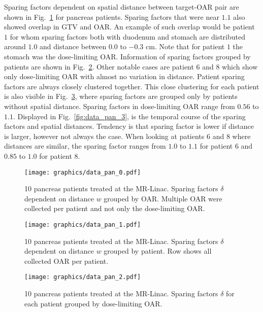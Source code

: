 \documentclass[\relativeRoot/ada.tex]{subfiles}
\begin{document}
Sparing factors dependent on spatial distance between target-OAR pair are shown in Fig.~\ref{fig:data_pan_0} for pancreas patients. Sparing factors that were near $1.1$ also showed overlap in GTV and OAR. An example of such overlap would be patient $1$ for whom sparing factors both with duodenum and stomach are distributed around $1.0$ and distance between $0.0$ to $-0.3$ cm. Note that for patient $1$ the stomach was the dose-limiting OAR. Information of sparing factors grouped by patients are shown in Fig.~\ref{fig:data_pan_1}. Other notable cases are patient $6$ and $8$ which show only dose-limiting OAR with almost no variation in distance. Patient sparing factors are always closely clustered together. This close clustering for each patient is also visible in Fig.~\ref{fig:data_pan_2}, where sparing factors are grouped only by patients without spatial distance. Sparing factors in dose-limiting OAR range from $0.56$ to $1.1$. Displayed in Fig.~\ref{fig:data_pan_3}, is the temporal course of the sparing factors and spatial distances. Tendency is that sparing factor is lower if distance is larger, however not always the case. When looking at patients $6$ and $8$ where distances are similar, the sparing factor ranges from $1.0$ to $1.1$ for patient $6$ and $0.85$ to $1.0$ for patient $8$.

\begin{figure}[!htb]
    \centering
    \texttt{[image: graphics/data\_pan\_0.pdf]}
    \caption{10 pancreas patients treated at the MR-Linac. Sparing factors $\delta$ dependent on distance $w$ grouped by OAR. Multiple OAR were collected per patient and not only the dose-limiting OAR.}
    \label{fig:data_pan_0}
\end{figure}

\begin{figure}[!htb]
    \centering
    \texttt{[image: graphics/data\_pan\_1.pdf]}
    
    \caption{10 pancreas patients treated at the MR-Linac. Sparing factors $\delta$ dependent on distance $w$ grouped by patient. Row shows all collected OAR per patient.}
    \label{fig:data_pan_1}
\end{figure}

\begin{figure}[!htb]
    \centering
    \texttt{[image: graphics/data\_pan\_2.pdf]}
    \caption{10 pancreas patients treated at the MR-Linac. Sparing factors $\delta$ for each patient grouped by dose-limiting OAR.}
    \label{fig:data_pan_2}
\end{figure}
\end{document}
